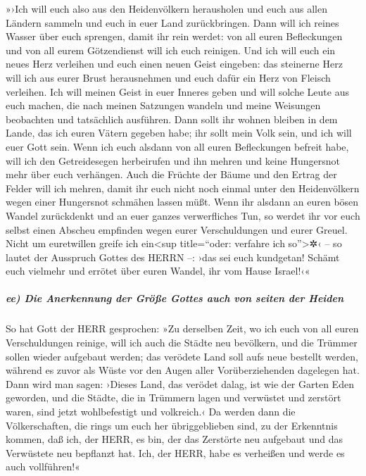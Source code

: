 »›Ich will euch also aus den Heidenvölkern herausholen
und euch aus allen Ländern sammeln und euch in euer Land zurückbringen.
Dann will ich reines Wasser über euch sprengen, damit ihr
rein werdet: von all euren Befleckungen und von all eurem Götzendienst
will ich euch reinigen. Und ich will euch ein neues Herz
verleihen und euch einen neuen Geist eingeben: das steinerne Herz will
ich aus eurer Brust herausnehmen und euch dafür ein Herz von Fleisch
verleihen. Ich will meinen Geist in euer Inneres geben
und will solche Leute aus euch machen, die nach meinen Satzungen wandeln
und meine Weisungen beobachten und tatsächlich ausführen.
Dann sollt ihr wohnen bleiben in dem Lande, das ich euren
Vätern gegeben habe; ihr sollt mein Volk sein, und ich will euer Gott
sein. Wenn ich euch alsdann von all euren Befleckungen
befreit habe, will ich den Getreidesegen herbeirufen und ihn mehren und
keine Hungersnot mehr über euch verhängen. Auch die
Früchte der Bäume und den Ertrag der Felder will ich mehren, damit ihr
euch nicht noch einmal unter den Heidenvölkern wegen einer Hungersnot
schmähen lassen müßt. Wenn ihr alsdann an euren bösen
Wandel zurückdenkt und an euer ganzes verwerfliches Tun, so werdet ihr
vor euch selbst einen Abscheu empfinden wegen eurer Verschuldungen und
eurer Greuel. Nicht um euretwillen greife ich
ein\textless sup title=``oder: verfahre ich so''\textgreater✲‹ -- so
lautet der Ausspruch Gottes des HERRN --: ›das sei euch kundgetan!
Schämt euch vielmehr und errötet über euren Wandel, ihr vom Hause
Israel!‹«

\hypertarget{ee-die-anerkennung-der-gruxf6uxdfe-gottes-auch-von-seiten-der-heiden}{%
\subparagraph{ee) Die Anerkennung der Größe Gottes auch von seiten der
Heiden}\label{ee-die-anerkennung-der-gruxf6uxdfe-gottes-auch-von-seiten-der-heiden}}

So hat Gott der HERR gesprochen: »Zu derselben Zeit, wo
ich euch von all euren Verschuldungen reinige, will ich auch die Städte
neu bevölkern, und die Trümmer sollen wieder aufgebaut werden;
das verödete Land soll aufs neue bestellt werden, während
es zuvor als Wüste vor den Augen aller Vorüberziehenden dagelegen hat.
Dann wird man sagen: ›Dieses Land, das verödet dalag, ist
wie der Garten Eden geworden, und die Städte, die in Trümmern lagen und
verwüstet und zerstört waren, sind jetzt wohlbefestigt und volkreich.‹
Da werden dann die Völkerschaften, die rings um euch her
übriggeblieben sind, zu der Erkenntnis kommen, daß ich, der HERR, es
bin, der das Zerstörte neu aufgebaut und das Verwüstete neu bepflanzt
hat. Ich, der HERR, habe es verheißen und werde es auch vollführen!«

